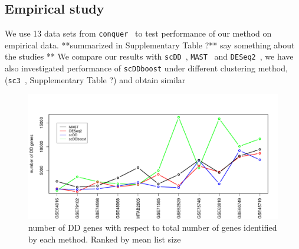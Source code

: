 \documentclass[aoas,preprint]{imsart}
\begin{document}
\subsection{Empirical study}


We use 13 data sets from \verb+conquer+~\citep{ref:Cq} to test 
performance of our method on empirical data. **summarized in Supplementary Table ?** say something about
the studies **  We compare our results with 
\verb+scDD+~\citep{ref:scDD}, \verb+MAST+~\citep{ref:MAST} and 
\verb+DESeq2+~\citep{ref:Des}, 
we have also investigated performance of \verb+scDDboost+ under different clustering 
method, (\verb+sc3+~\citep{sc3}, Supplementary Table ?)  and obtain similar 

\begin{figure}[H]
\includegraphics[width = 1\textwidth]{Figs/DD95.pdf}
 \caption{ number of DD genes with respect to total number of genes identified by each method. Ranked by mean list size}
  \label{fig:6}
\end{figure}
\end{document}
